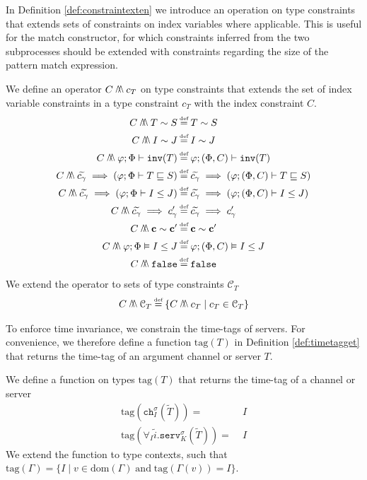 In Definition \ref{def:constraintexten} we introduce an operation on type constraints that extends sets of constraints on index variables where applicable. This is useful for the match constructor, for which constraints inferred from the two subprocesses should be extended with constraints regarding the size of the pattern match expression.
%
\begin{definition}\label{def:constraintexten}
We define an operator $C\merge c_T$ on type constraints that extends the set of index variable constraints in a type constraint $c_T$ with the index constraint $C$.
\begin{align*}
    C \merge T \sim S \defeq&\; T \sim S\\
    C \merge I \sim J \defeq&\; I \sim J \\
    C \merge \varphi;\Phi\vdash \texttt{inv}(T) \defeq&\; \varphi;(\Phi,C)\vdash \texttt{inv}(T)\\
    C \merge \widetilde{c_\gamma} \implies (\varphi;\Phi\vdash T \sqsubseteq S) \defeq&\; \widetilde{c_\gamma} \implies (\varphi;(\Phi,C)\vdash T \sqsubseteq S)\\
    C \merge \widetilde{c_\gamma} \implies (\varphi;\Phi\vdash I \leq J) \defeq&\; \widetilde{c_\gamma}\implies (\varphi;(\Phi,C)\vdash I \leq J)\\
    C \merge \widetilde{c_\gamma} \implies c_\gamma' \defeq&\; \widetilde{c_\gamma} \implies c_\gamma' \\
    C \merge \mathbf{c} \sim \mathbf{c}' \defeq&\; \mathbf{c} \sim \mathbf{c}'\\
    C\merge \varphi;\Phi\vDash I \leq J \defeq&\; \varphi;(\Phi,C)\vDash I\leq J \\
    C\merge \texttt{false} \defeq&\; \texttt{false}
\end{align*}
We extend the operator to sets of type constraints $\mathcal{C}_T$
\begin{align*}
    C \merge \mathcal{C}_T \defeq \{ C \merge c_T \mid c_T \in \mathcal{C}_T \}
\end{align*}
\end{definition}
%
To enforce time invariance, we constrain the time-tags of servers. For convenience, we therefore define a function $\text{tag}(T)$ in Definition \ref{def:timetagget} that returns the time-tag of an argument channel or server $T$.
\begin{definition}\label{def:timetagget}
We define a function on types $\text{tag}(T)$ that returns the time-tag of a channel or server
\begin{align*}
    \text{tag}(\texttt{ch}^\sigma_I(\widetilde{T})) =&\; I\\
    \text{tag}(\forall_I\widetilde{i}.\texttt{serv}^\sigma_K(\widetilde{T})) =&\; I
\end{align*}
We extend the function to type contexts, such that $\text{tag}(\Gamma) = \{ I \mid v \in \text{dom}(\Gamma)\; \text{and}\; \text{tag}(\Gamma(v)) = I \}$.
\end{definition}
